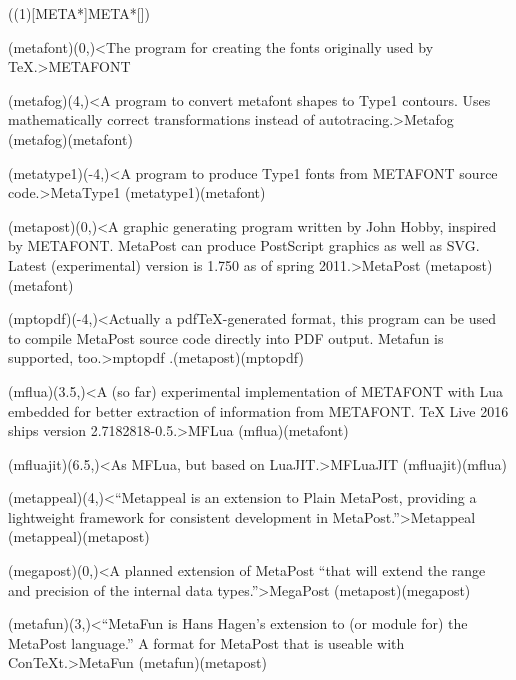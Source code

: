 \tograph(\tostruct(1)[META*]{META*}[\program]){
	\tonode(metafont)(0,\layer)<The program for creating the fonts originally used by TeX.>{METAFONT}
	\steplayer

	\tonode(metafog)(4,\layer)<A program to convert metafont shapes to Type1 contours. Uses mathematically correct transformations instead of autotracing.>{Metafog}
	\todraw(metafog)(metafont)

	\tonode(metatype1)(-4,\layer)<A program to produce Type1 fonts from METAFONT source code.>{MetaType1}
	\todraw(metatype1)(metafont)
	\steplayer[-1]

	\tonode(metapost)(0,\layer)<A graphic generating program written by John Hobby, inspired by METAFONT. MetaPost can produce PostScript graphics as well as SVG. Latest (experimental) version is 1.750 as of spring 2011.>{MetaPost}
	\todraw(metapost)(metafont)
	\steplayer[-1]

	\tonode[\normalimportant](mptopdf)(-4,\layer)<Actually a pdfTeX-generated format, this program can be used to compile MetaPost source code directly into PDF output. Metafun is supported, too.>{mptopdf}
	\todraw.(metapost)(mptopdf)

	\tonode[\experimental](mflua)(3.5,\layer)<A (so far) experimental implementation of METAFONT with Lua embedded for better extraction of information from METAFONT. TeX Live 2016 ships version 2.7182818-0.5.>{MFLua}
	\todraw(mflua)(metafont)
	\steplayer[-0.5]

	\tonode[\experimental](mfluajit)(6.5,\layer)<As MFLua, but based on LuaJIT.>{MFLuaJIT}
	\todraw(mfluajit)(mflua)
	\steplayer[-1.5]

	\tonode[\normalimportant](metappeal)(4,\layer)<“Metappeal is an extension to Plain MetaPost, providing a lightweight framework 
for consistent development in MetaPost.”>{Metappeal}
	\todraw(metappeal)(metapost)
	\steplayer[-1]

	\tonode[\experimental](megapost)(0,\layer)<A planned extension of MetaPost “that will extend the range
and precision of the internal data types.”>{MegaPost}
	\todraw(metapost)(megapost)
	\steplayer[-1]

	\tonode[\normalimportant](metafun)(3,\layer)<“MetaFun is Hans Hagen's extension to (or module for) the MetaPost language.” A format for MetaPost that is useable with ConTeXt.>{MetaFun}
	\todraw(metafun)(metapost)
}

